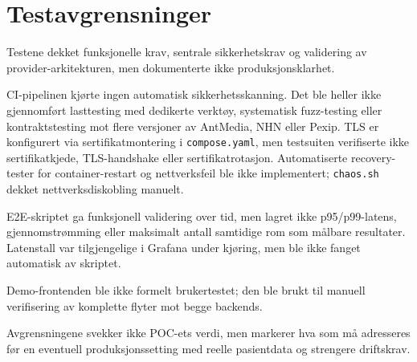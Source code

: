 \section{Testavgrensninger}
\label{sec:testavgrensninger}

Testene dekket funksjonelle krav, sentrale sikkerhetskrav og validering
av provider-arkitekturen, men dokumenterte ikke produksjonsklarhet.

CI-pipelinen kjørte ingen automatisk sikkerhetsskanning. Det ble heller
ikke gjennomført lasttesting med dedikerte verktøy, systematisk
fuzz-testing eller kontraktstesting mot flere versjoner av AntMedia,
NHN eller Pexip. TLS er konfigurert via sertifikatmontering i
\texttt{compose.yaml}, men testsuiten verifiserte ikke sertifikatkjede,
TLS-handshake eller sertifikatrotasjon. Automatiserte recovery-tester
for container-restart og nettverksfeil ble ikke implementert;
\texttt{chaos.sh} dekket nettverksdiskobling manuelt.

E2E-skriptet ga funksjonell validering over tid, men lagret ikke
p95/p99-latens, gjennomstrømming eller maksimalt antall samtidige rom
som målbare resultater. Latenstall var tilgjengelige i Grafana under
kjøring, men ble ikke fanget automatisk av skriptet.

Demo-frontenden ble ikke formelt brukertestet; den ble brukt til
manuell verifisering av komplette flyter mot begge backends.

Avgrensningene svekker ikke POC-ets verdi, men markerer
hva som må adresseres før en eventuell produksjonssetting med reelle
pasientdata og strengere driftskrav.